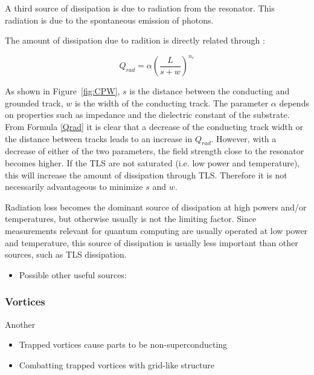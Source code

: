 \documentclass[12pt]{report}
\begin{document}
A third source of dissipation is due to radiation from the resonator. This radiation is due to the spontaneous emission of photons.

The amount of dissipation due to radition is directly related through \cite{sage2011study,Mazin}:

\begin{equation}
    Q_{rad} = \alpha \left( \frac{L}{s + w}\right)^{n_r}
    \label{Qrad}
\end{equation}

As shown in Figure~\ref{fig:CPW}, $s$ is the distance between the conducting and grounded track, $w$ is the width of the conducting track. The parameter $\alpha$ depends on properties such as impedance and the dielectric constant of the substrate. From Formula \ref{Qrad} it is clear that a decrease of the conducting track width or the distance between tracks leads to an increase in $Q_{rad}$. However, with a decrease of either of the two parameters, the field strength close to the resonator becomes higher. If the TLS are not saturated (i.e. low power and temperature), this will increase the amount of dissipation through TLS. Therefore it is not necessarily advantageous to minimize $s$ and $w$.

Radiation loss becomes the dominant source of dissipation at high powers and/or temperatures, but otherwise usually is not the limiting factor. Since measurements relevant for quantum computing are usually operated at low power and temperature, this source of dissipation is usually less important than other sources, such as TLS dissipation.

\begin{itemize}
    \item Possible other useful sources: \cite{denlinger1969radiation} \cite{khalil2011loss}
\end{itemize}



\subsubsection{Vortices}

Another

\begin{itemize}
    \item Trapped vortices cause parts to be non-superconducting
    \item Combatting trapped vortices with grid-like structure
\end{itemize}
\end{document}
